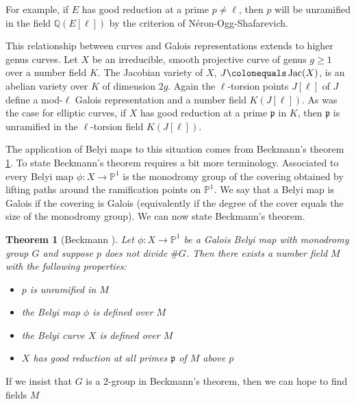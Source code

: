 \documentclass{dcthesis}
\newcommand{\PP}{\mathbb P}
\newcommand{\QQ}{\mathbb Q}
\newcommand{\defi}[1]{\textsf{#1}}
\DeclareMathOperator{\Jac}{Jac}
\numberwithin{equation}{section}
\newtheorem{theorem}[equation]{Theorem}
\theoremstyle{definition}
\theoremstyle{remark}
\begin{document}
{{{    For example,
    if $E$ has good reduction at a prime $p\neq\ell$,
    then $p$ will be unramified in
    the field $\QQ(E[\ell])$
    by the criterion of
    N\'{e}ron-Ogg-Shafarevich.
    \par
    This relationship between curves and Galois
    representations extends to higher genus
    curves.
    Let $X$ be an
    irreducible, smooth projective
    curve
    of genus $g\geq 1$
    over a number field $K$.
    The Jacobian variety of $X$,
    $J\colonequals \Jac(X)$,
    is an abelian variety over $K$
    of dimension $2g$.
    Again the $\ell$-torsion points
    $J[\ell]$ of $J$
    define a mod-$\ell$ Galois representation
    and a number field $K(J[\ell])$.
    As was the case for elliptic curves,
    if $X$ has good reduction at a prime
    $\mathfrak{p}$ in $K$,
    then $\mathfrak{p}$ is unramified in
    the $\ell$-torsion field
    $K(J[\ell])$.
    \par
    The application of Belyi maps to this
    situation comes from Beckmann's theorem
    \ref{thm:beckmann}.
    To state Beckmann's theorem requires
    a bit more terminology.
    Associated to every Belyi map
    $\phi\colon X\to\PP^1$
    is the \defi{monodromy group}
    of the covering
    obtained by lifting paths around
    the ramification points on $\PP^1$.
    We say that a Belyi map is
    \defi{Galois} if the covering is Galois
    (equivalently if the degree
    of the cover equals the size
    of the monodromy group).
    We can now state Beckmann's theorem.
    \begin{theorem}[Beckmann \cite{beckmann}]
      \label{thm:beckmann}
      Let $\phi\colon X\to\PP^1$
      be a Galois Belyi map with
      monodromy group $G$
      and suppose $p$ does not divide $\# G$.
      Then there exists a number field $M$
      with the following properties:
      \begin{itemize}
        \item
          $p$ is unramified in $M$
        \item
          the Belyi map $\phi$ is defined over $M$
        \item
          the Belyi curve $X$ is defined over $M$
        \item
          $X$ has good reduction at all primes $\mathfrak{p}$
          of $M$ above $p$
      \end{itemize}
    \end{theorem}
    If we insist that $G$ is a $2$-group
    in Beckmann's theorem,
    then we can hope to find
    fields $M$
}}}
\end{document}
